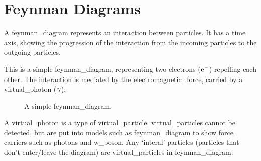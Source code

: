     \newpage

\section{Feynman Diagrams} \label{feynman_diagrams}
    A \gls{feynman_diagram} represents an interaction between particles.
    It has a time axis, showing the progression of the interaction from the incoming particles to the outgoing particles.
    
    This is a simple \gls{feynman_diagram}, representing two \glspl{electron} ($\electron[-]$) repelling each other.
    The interaction is mediated by the \gls{electromagnetic_force}, carried by a \gls{virtual_photon} ($\photon$):

    \begin{figure} \label{fig:electron_repulsion}
        \begin{center}
        \end{center}
        \caption{A simple \gls{feynman_diagram}.}
    \end{figure}

    A \gls{virtual_photon} is a type of \gls{virtual_particle}.
    \Glspl{virtual_particle} cannot be detected, but are put into models such as \gls{feynman_diagram} to show force carriers such as \glspl{photon} and \gls{w_boson}.
    Any `interal' particles (particles that don't enter/leave the diagram) are \glspl{virtual_particle} in \gls{feynman_diagram}.

